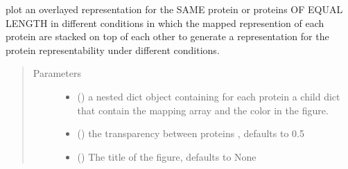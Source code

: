 \documentclass[letterpaper,10pt,english]{sphinxmanual}
\begin{document}
\begin{fulllineitems}
\label{\detokenize{IPTK.Visualization:IPTK.Visualization.vizTools.plot_overlay_representation}}
plot an overlayed representation for the SAME protein or proteins OF EQUAL LENGTH in different conditions        in which the mapped represention of each protein are stacked on top of each other to generate        a representation for the protein representability under different conditions.
\begin{quote}\begin{description}
\item[{Parameters}] \leavevmode\begin{itemize}
\item {} 
 (\sphinxstyleliteralemphasis{\sphinxupquote{{[}}}\sphinxstyleliteralemphasis{\sphinxupquote{,}}\sphinxstyleliteralemphasis{\sphinxupquote{{]}}}\sphinxstyleliteralemphasis{\sphinxupquote{{]}}}) \textendash{} a nested dict object containing for each protein a child dict that contain the mapping array and the color in the figure.

\item {} 
 (\sphinxstyleliteralemphasis{\sphinxupquote{, }}) \textendash{} the transparency between proteins , defaults to 0.5

\item {} 
 (\sphinxstyleliteralemphasis{\sphinxupquote{, }}) \textendash{} The title of the figure, defaults to None


\end{itemize}
\end{description}
\end{quote}
\end{fulllineitems}
\end{document}
